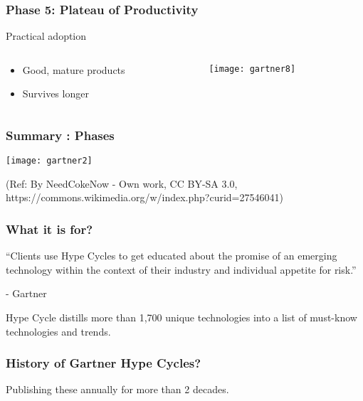 \begin{frame}[fragile]\frametitle{Phase 5: Plateau of Productivity}

Practical adoption


 \begin{columns}
  \begin{column}{0.55\linewidth}
\begin{itemize}
\item Good, mature products
\item Survives longer
\end{itemize}
  \end{column}%
  \begin{column}{0.45\linewidth}
			\begin{center}
			\texttt{[image: gartner8]}
			\end{center}
  \end{column}
 \end{columns}
 
\end{frame}


\begin{frame}[fragile]\frametitle{Summary : Phases}

\begin{center}
\texttt{[image: gartner2]}
\end{center}

{\tiny (Ref: By NeedCokeNow - Own work, CC BY-SA 3.0, https://commons.wikimedia.org/w/index.php?curid=27546041)}
\end{frame}

\begin{frame}[fragile]\frametitle{What it is for?}

``Clients use Hype Cycles to get educated about the promise of an emerging technology within the context of their industry and individual appetite for risk.''

- Gartner 

Hype Cycle distills more than 1,700 unique technologies into a list of must-know technologies and trends.

\end{frame}

\begin{frame}[fragile]\frametitle{History of Gartner Hype Cycles?}

Publishing these annually for more than 2 decades.

\end{frame}

